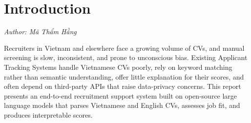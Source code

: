 \section{Introduction}
\noindent\textit{Author: Mã Thẩm Hằng}


Recruiters in Vietnam and elsewhere face a growing volume of CVs, and manual
screening is slow, inconsistent, and prone to unconscious bias. Existing
Applicant Tracking Systems handle Vietnamese CVs poorly, rely on keyword
matching rather than semantic understanding, offer little explanation for
their scores, and often depend on third-party APIs that raise data-privacy
concerns. This report presents an end-to-end recruitment support system built
on open-source large language models that parses Vietnamese and English CVs,
assesses job fit, and produces interpretable scores.
